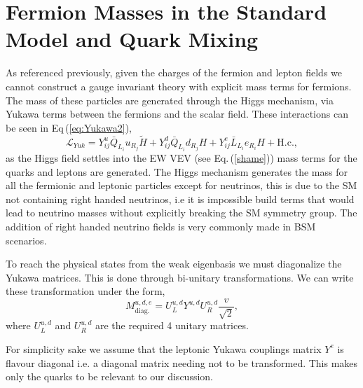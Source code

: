 \renewcommand{\cleardoublepage}{}
\renewcommand{\clearpage}{}

\section{Fermion Masses in the Standard Model and Quark Mixing}
\label{Chap_1_Sec_3}

As referenced previously, given the charges of the fermion and lepton fields we cannot construct a gauge invariant theory with explicit mass terms for fermions. 
%
The mass of these particles are generated through the Higgs mechanism, via Yukawa terms between the fermions and the scalar field. 
%
These interactions can be seen in Eq\,(\ref{eq:Yukawa2}), 
%
\begin{equation} 
\label{eq:Yukawa2}
\mathcal{L}_{Yuk} = Y^u_{ij} \bar{Q}_{L_i} u_{R_j}  \tilde{H} + Y^d_{ij} \bar{Q}_{L_i}  d_{R_j} H  + Y^e_{ij} \bar{L}_{L_i}  e_{R_i} H + \text{H.c.} , 
\end{equation} 
%
as the Higgs field settles into the EW VEV (see Eq.\,(\ref{shame})) mass terms for the quarks and leptons are generated. 
%
The Higgs mechanism generates the mass for all the fermionic and leptonic particles except for neutrinos, this is due to the SM not containing right handed neutrinos, i.e it is impossible build terms that would lead to neutrino masses without explicitly breaking the SM symmetry group.
% 
The addition of right handed neutrino fields is very commonly made in BSM scenarios. 

To reach the physical states from the weak eigenbasis we must diagonalize the Yukawa matrices. This is done through bi-unitary transformations. 
% 
We can write these transformation under the form,
%
\begin{equation}
\label{YukawaMasses} 
M^{u,d,e}_{\text{diag.}}= U^{u,d}_L Y^{u,d} U^{u,d}_R \frac{v}{\sqrt{2}} , 
\end{equation} 
%
where $U^{u,d}_L$ and $U^{u,d}_R$ are the required 4 unitary matrices. 

%
%
For simplicity sake we assume that the leptonic Yukawa couplings matrix $Y^{e}$ is flavour diagonal i.e. a diagonal matrix needing not to be transformed. This makes only the quarks to be relevant to our discussion.  

